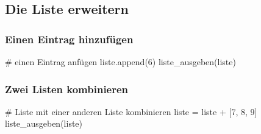 \documentclass{\VorlagenPfad/coderdojokatext}
\begin{document}
\subsection{Die Liste erweitern}
\subsubsection{Einen Eintrag hinzufügen}
\begin{pythoncode}
# einen Eintrag anfügen
liste.append(6)
liste_ausgeben(liste)
\end{pythoncode}

\subsubsection{Zwei Listen kombinieren}
\begin{pythoncode}
# Liste mit einer anderen Liste kombinieren
liste = liste + [7, 8, 9]
liste_ausgeben(liste)
\end{pythoncode}
\end{document}
